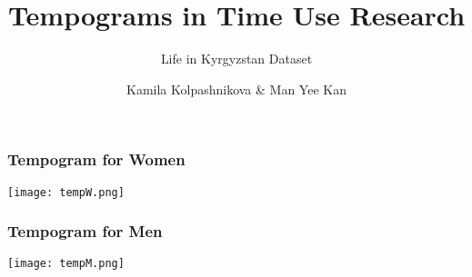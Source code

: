 \documentclass{beamer}
\begin{document}
\title[Housework Research] %
{Tempograms in Time Use Research}
 
\subtitle{Life in Kyrgyzstan Dataset}

\author[Kolpashnikova, Kamila] %
{Kamila Kolpashnikova \& Man Yee Kan }
 

\begin{frame}
\maketitle
\end{frame}
                        
\begin{frame}
\frametitle{Tempogram for Women}

   \texttt{[image: tempW.png]}
 	
\end{frame}

\begin{frame}
\frametitle{Tempogram for Men}

   \texttt{[image: tempM.png]}
 	
\end{frame}
\end{document}
